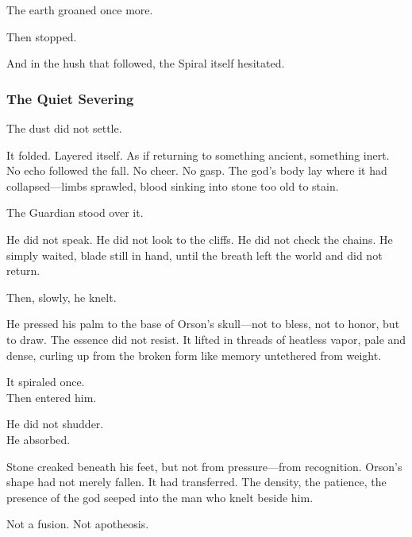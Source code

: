 \documentclass[12pt]{article}
\begin{document}
\vspace{0.5em}
The earth groaned once more.

\vspace{0.5em}
Then stopped.

\vspace{0.5em}
And in the hush that followed, the Spiral itself hesitated.


\dotfill

\subsubsection*{The Quiet Severing}

The dust did not settle.

\vspace{0.5em}
It folded. Layered itself. As if returning to something ancient, something inert. No echo followed the fall. No cheer. No gasp. The god’s body lay where it had collapsed---limbs sprawled, blood sinking into stone too old to stain.

\vspace{0.5em}
The Guardian stood over it.

\vspace{0.5em}
He did not speak. He did not look to the cliffs. He did not check the chains. He simply waited, blade still in hand, until the breath left the world and did not return.

\vspace{0.5em}
Then, slowly, he knelt.

\vspace{0.5em}
He pressed his palm to the base of Orson’s skull---not to bless, not to honor, but to draw. The essence did not resist. It lifted in threads of heatless vapor, pale and dense, curling up from the broken form like memory untethered from weight.

\vspace{0.5em}
It spiraled once.\\
Then entered him.

\vspace{0.5em}
He did not shudder.\\
He absorbed.

\vspace{0.5em}
Stone creaked beneath his feet, but not from pressure---from recognition. Orson’s shape had not merely fallen. It had transferred. The density, the patience, the presence of the god seeped into the man who knelt beside him.

\vspace{0.5em}
Not a fusion. Not apotheosis.
\end{document}

